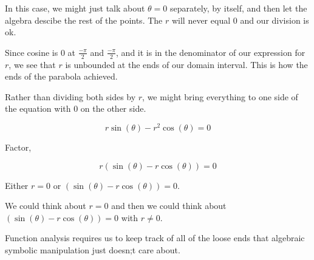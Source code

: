 \documentclass{ximera}
\begin{document}
\begin{example}
\begin{explanation}
\begin{warning}
      In this case, we might just talk about $\theta = 0$ separately, by itself, and then let the algebra descibe the rest of the points.  The $r$ will never equal $0$ and our division is ok.
      \end{warning}



      Since cosine is $0$ at $\frac{-\pi}{2}$ and $\frac{-\pi}{2}$, and it is in the denominator of our expression for $r$, we see that $r$ is unbounded at the ends of our domain interval.  This is how the ends of the parabola achieved.





  \end{explanation}







\begin{center}
\end{center}



\end{example}



\begin{idea}  



Rather than dividing both sides by $r$, we might bring everything to one side of the equation with $0$ on the other side.



\[ r \sin(\theta) - r^2 \cos(\theta) = 0   \]


Factor, 

\[ r (\sin(\theta) - r \cos(\theta)) = 0   \]



Either $r = 0$ or $(\sin(\theta) - r \cos(\theta)) = 0$.

We could think about $r=0$ and then we could think about $(\sin(\theta) - r \cos(\theta)) = 0$ with $r \ne 0$.


Function analysis requires us to keep track of all of the loose ends that algebraic symbolic manipulation just doesn;t care about.



\end{idea}
\end{document}

